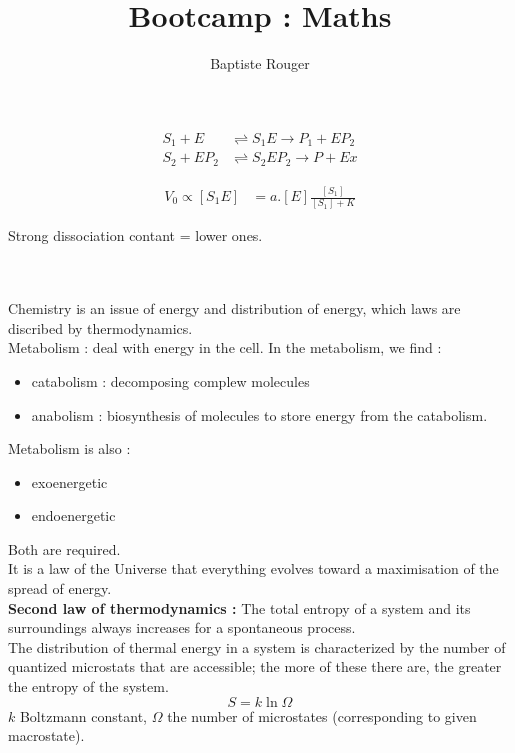 \documentclass{article}
\title{Bootcamp : Maths}
\author{Baptiste Rouger}
\begin{document}
    \maketitle

    \tableofcontents

    \newpage

\begin{align*}
    S_1 + E &\rightleftharpoons  S_1E \rightarrow P_1 + EP_2 \\
    S_2 + EP_2 &\rightleftharpoons S_2EP_2 \rightarrow P + Ex
\end{align*}

\begin{align*}
    V_0 \propto [S_1E] &= a.[E]\frac{[S_1]}{[S_1]+K}
\end{align*}

Strong dissociation contant = lower ones.

~\\~\\

Chemistry is an issue of energy and distribution of energy, which laws are discribed by thermodynamics.\\

Metabolism : deal with energy in the cell. In the metabolism, we find :
\begin{itemize}
    \item catabolism : decomposing complew molecules
    \item anabolism : biosynthesis of molecules to store energy from the catabolism.
\end{itemize}

Metabolism is also :
\begin{itemize}
    \item exoenergetic
    \item endoenergetic
\end{itemize}
Both are required.\\

It is a law of the Universe that everything evolves toward a maximisation of the spread of energy.\\

\textbf{Second law of thermodynamics :} The total entropy of a system and its surroundings always increases for a spontaneous process.\\
The distribution of thermal energy in a system is characterized by the number of quantized microstats that are accessible; the more of these there are, the greater the entropy of the system.\\
\[ S = k \ln \Omega \]
 $k$ Boltzmann constant, $\Omega$ the number of microstates (corresponding to given macrostate).
\end{document}

